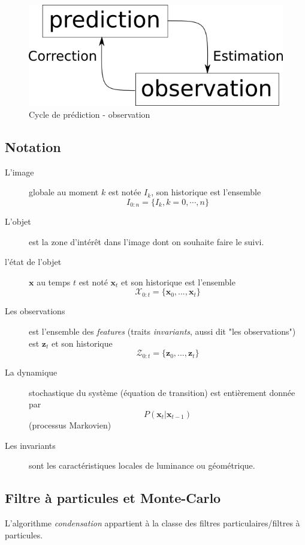 \documentclass[a4paper,12pt]{report}
\begin{document}
\begin{figure}[H]

\includegraphics[scale=0.5]{figurePredictionObservationCycle.png}
\centering
\caption{Cycle de prédiction - observation}
\end{figure}

\subsection{Notation}
\begin{description}
\item[L'image] globale au moment $k$ est notée $I_k$, son historique est l'ensemble $$I_{0:n}=\{I_k, k=0,\cdots,n\}$$
\item[L'objet] est la zone d'intérêt dans l'image dont on souhaite faire le suivi.
\item[l'état de l'objet] $\mathbf{x}$ au temps $t$ est noté $\mathbf{x}_t$ et son historique est l'ensemble $$\mathcal{X}_{0:t} = \{\mathbf{x}_0,...,\mathbf{x}_t\}$$
\item[Les observations] est l'ensemble des \textit{features} (traits \textit{invariants}, aussi dit "les observations") est $\mathbf{z}_t$ et son historique $$ \mathcal{Z}_{0:t}=\{\mathbf{z}_0,...,\mathbf{z}_t\}$$
\item[La dynamique] stochastique du système (équation de transition) est entièrement donnée par $$P(\mathbf{x}_t|\mathbf{x}_{t-1})$$ (processus Markovien)
\item[Les invariants] sont les caractéristiques locales de luminance ou géométrique.
\end{description}

\subsection{Filtre à particules et Monte-Carlo}
L'algorithme \textit{condensation} appartient à la classe des filtres particulaires/filtres à particules. 
\end{document}
